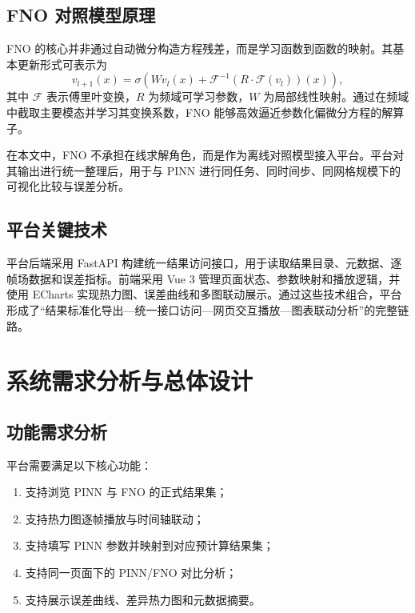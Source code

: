 \documentclass[UTF8,zihao=-4]{oucart}
\begin{document}
\subsection{FNO 对照模型原理}

FNO 的核心并非通过自动微分构造方程残差，而是学习函数到函数的映射。其基本更新形式可表示为
\begin{equation}
v_{l+1}(x)=\sigma\left(Wv_l(x)+\mathcal{F}^{-1}\left(R\cdot \mathcal{F}(v_l)\right)(x)\right),
\end{equation}
其中 $\mathcal{F}$ 表示傅里叶变换，$R$ 为频域可学习参数，$W$ 为局部线性映射。通过在频域中截取主要模态并学习其变换系数，FNO 能够高效逼近参数化偏微分方程的解算子\cite{li2021fno,kovachki2023}。

在本文中，FNO 不承担在线求解角色，而是作为离线对照模型接入平台。平台对其输出进行统一整理后，用于与 PINN 进行同任务、同时间步、同网格规模下的可视化比较与误差分析。

\subsection{平台关键技术}

平台后端采用 FastAPI 构建统一结果访问接口，用于读取结果目录、元数据、逐帧场数据和误差指标\cite{fastapi_docs}。前端采用 Vue 3 管理页面状态、参数映射和播放逻辑\cite{vue_docs}，并使用 ECharts 实现热力图、误差曲线和多图联动展示\cite{echarts_docs}。通过这些技术组合，平台形成了“结果标准化导出—统一接口访问—网页交互播放—图表联动分析”的完整链路。

\section{系统需求分析与总体设计}

\subsection{功能需求分析}

平台需要满足以下核心功能：
\begin{enumerate}[label=\arabic*)]
  \item 支持浏览 PINN 与 FNO 的正式结果集；
  \item 支持热力图逐帧播放与时间轴联动；
  \item 支持填写 PINN 参数并映射到对应预计算结果集；
  \item 支持同一页面下的 PINN/FNO 对比分析；
  \item 支持展示误差曲线、差异热力图和元数据摘要。
\end{enumerate}
\end{document}
